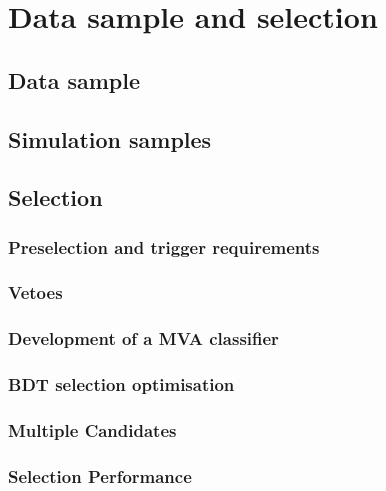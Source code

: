 \chapter{Data sample and selection}



\section{Data sample}



\section{Simulation samples}



\section{Selection}



\subsection{Preselection and trigger requirements}


\subsection{Vetoes}



\subsection{Development of a MVA classifier}



\subsection{BDT selection optimisation}



\subsection{Multiple Candidates}



\subsection{Selection Performance}


